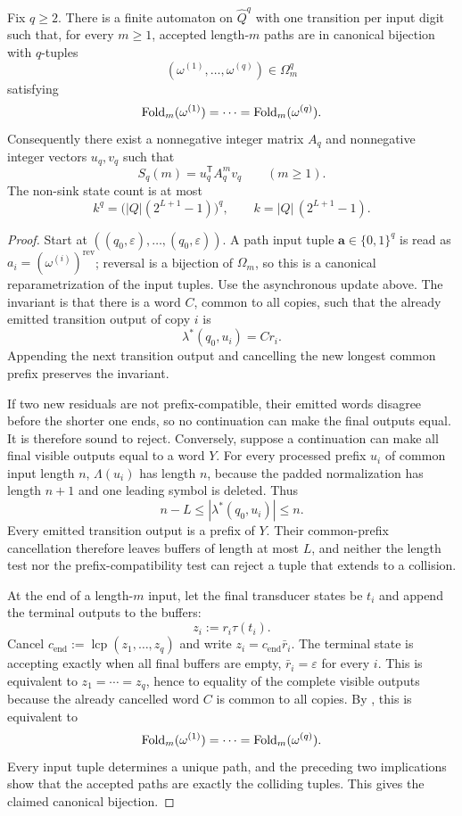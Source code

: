 \begin{proposition}
\label{prop:appendix-collision-automaton}
Fix \(q\ge 2\).  There is a finite automaton on \(\widehat Q^q\) with one
transition per input digit such that, for every \(m\ge 1\), accepted
length-\(m\) paths are in canonical bijection with \(q\)-tuples
\[
  (\omega^{(1)},\dots,\omega^{(q)})\in\Omega_m^q
\]
satisfying
\[
  \mathrm{Fold}_m(\omega^{(1)})=\cdots=\mathrm{Fold}_m(\omega^{(q)}).
\]
Consequently there exist a nonnegative integer matrix \(A_q\) and nonnegative
integer vectors \(u_q,v_q\) such that
\[
  S_q(m)=u_q^{\mathsf T}A_q^m v_q
  \qquad (m\ge 1).
\]
The non-sink state count is at most
\[
  k^q=\bigl(|Q|(2^{L+1}-1)\bigr)^q,
  \qquad k=|Q|\,(2^{L+1}-1).
\]
\end{proposition}

\begin{proof}
Start at \(((q_0,\varepsilon),\dots,(q_0,\varepsilon))\).  A path input tuple
\(\mathbf a\in\{0,1\}^q\) is read as
\(a_i=(\omega^{(i)})^{\mathrm{rev}}\); reversal is a bijection of
\(\Omega_m\), so this is a canonical reparametrization of the input tuples.
Use the asynchronous update above.  The invariant
is that there is a word \(C\), common to all copies, such that the already
emitted transition output of copy \(i\) is
\[
  \lambda^*(q_0,u_i)=Cr_i.
\]
Appending the next transition output and cancelling the new longest common
prefix preserves the invariant.

If two new residuals are not prefix-compatible, their emitted words disagree
before the shorter one ends, so no continuation can make the final outputs
equal.  It is therefore sound to reject.  Conversely, suppose a continuation
can make all final visible outputs equal to a word \(Y\).  For every processed
prefix \(u_i\) of common input length \(n\), \(\Lambda(u_i)\) has length
\(n\), because the padded normalization has length \(n+1\) and one leading
symbol is deleted.  Thus
\[
  n-L\le |\lambda^*(q_0,u_i)|\le n.
\]
Every emitted transition output is a prefix of \(Y\).  Their common-prefix
cancellation therefore leaves buffers of length at most \(L\), and neither
the length test nor the prefix-compatibility test can reject a tuple that
extends to a collision.

At the end of a length-\(m\) input, let the final transducer states be \(t_i\)
and append the terminal outputs to the buffers:
\[
  z_i:=r_i\tau(t_i).
\]
Cancel \(c_{\mathrm{end}}:=\operatorname{lcp}(z_1,\dots,z_q)\) and write
\(z_i=c_{\mathrm{end}}\bar r_i\).  The terminal state is accepting exactly
when all final buffers are empty, \(\bar r_i=\varepsilon\) for every \(i\).
This is equivalent to \(z_1=\cdots=z_q\), hence to equality of the complete
visible outputs because the already cancelled word \(C\) is common to all
copies.  By , this is equivalent to
\[
  \mathrm{Fold}_m(\omega^{(1)})=\cdots=\mathrm{Fold}_m(\omega^{(q)}).
\]
Every input tuple determines a unique path, and the preceding two implications
show that the accepted paths are exactly the colliding tuples.  This gives the
claimed canonical bijection.


\end{proof}
